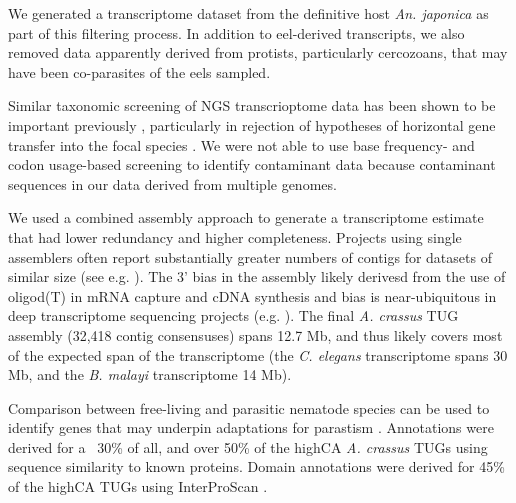 \documentclass[10pt]{bmc_article}
\newenvironment{bmcformat}{\begin{raggedright}\baselineskip20pt\sloppy\setboolean{publ}{false}}{\end{raggedright}\baselineskip20pt\sloppy}
\begin{document}
\begin{bmcformat}
We generated a transcriptome dataset from the definitive host
\textit{An. japonica} as part of this filtering process. In addition
to eel-derived transcripts, we also removed data apparently derived
from protists, particularly cercozoans, that may have been
co-parasites of the eels sampled.

Similar taxonomic screening of NGS transcrioptome data has been shown
to be important previously \cite{pmid21138572}, particularly in
rejection of hypotheses of horizontal gene transfer into the focal
species \cite{pmid20386959}. We were not able to use base frequency-
and codon usage-based screening to identify contaminant data
\cite{pmid20034392, pmid17218127} because contaminant sequences in our
data derived from multiple genomes.


We used a combined assembly approach \cite{pmid20950480} to generate a
transcriptome estimate that had lower redundancy and higher
completeness. Projects using single assemblers often report
substantially greater numbers of contigs for datasets of similar size
(see e.g. \cite{pmid21364769}). The 3’ bias in the assembly likely
derivesd from the use of oligod(T) in mRNA capture and cDNA synthesis
and bias is near-ubiquitous in deep transcriptome sequencing projects
(e.g.  \cite{pmid20331785}). The final \textit{A. crassus} TUG
assembly (32,418 contig consensuses) spans 12.7 Mb, and thus likely
covers most of the expected span of the transcriptome (the
\textit{C. elegans} transcriptome spans 30 Mb, and the
\textit{B. malayi} transcriptome 14 Mb).

Comparison between free-living and parasitic nematode species can be
used to identify genes that may underpin adaptations for parastism
\cite{parkinson_transcriptomic_2004, wasmuth_extent_2008}. Annotations
were derived for a ~30\% of all, and over 50\% of the highCA
\textit{A. crassus} TUGs using sequence similarity to known
proteins. Domain annotations were derived for 45\% of the highCA TUGs
using InterProScan \cite{pmid11590104}.


\end{bmcformat}
\end{document}
